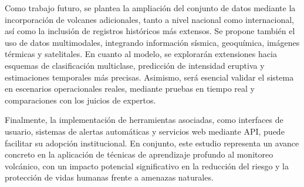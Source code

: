 \documentclass[conference]{IEEEtran}
\begin{document}
Como trabajo futuro, se plantea la ampliación del conjunto de datos mediante la incorporación de volcanes adicionales, tanto a nivel nacional como internacional, así como la inclusión de registros históricos más extensos. Se propone también el uso de datos multimodales, integrando información sísmica, geoquímica, imágenes térmicas y satelitales. En cuanto al modelo, se explorarán extensiones hacia esquemas de clasificación multiclase, predicción de intensidad eruptiva y estimaciones temporales más precisas. Asimismo, será esencial validar el sistema en escenarios operacionales reales, mediante pruebas en tiempo real y comparaciones con los juicios de expertos.

Finalmente, la implementación de herramientas asociadas, como interfaces de usuario, sistemas de alertas automáticas y servicios web mediante API, puede facilitar su adopción institucional. En conjunto, este estudio representa un avance concreto en la aplicación de técnicas de aprendizaje profundo al monitoreo volcánico, con un impacto potencial significativo en la reducción del riesgo y la protección de vidas humanas frente a amenazas naturales.
\end{document}
